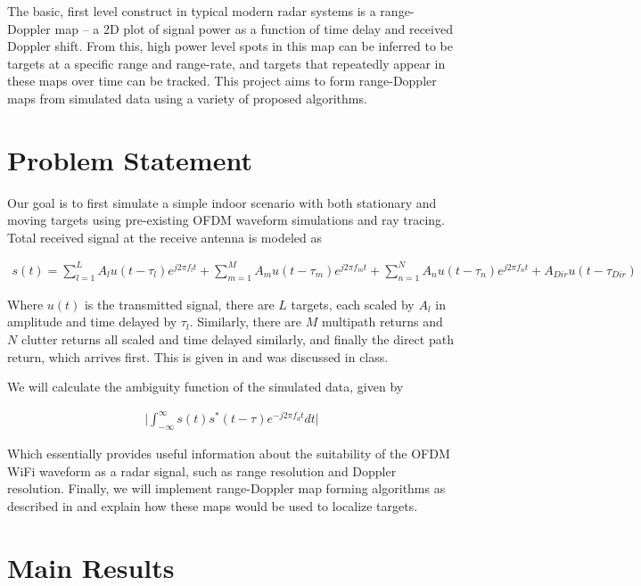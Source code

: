 \documentclass[article,11pt,onecolumn,final]{IEEEtran}
\begin{document}
The basic, first level construct in typical modern radar systems is a range-Doppler map -- a 2D plot of
signal power as a function of time delay and received Doppler shift. From this, high power level spots in
this map can be inferred to be targets at a specific range and range-rate, and targets that repeatedly
appear in these maps over time can be tracked. This project aims to form range-Doppler maps from
simulated data using a variety of proposed algorithms.

\section{Problem Statement} 
Our goal is to first simulate a simple indoor scenario with both stationary and moving targets using 
pre-existing OFDM waveform simulations and ray tracing. Total received signal at the receive antenna is modeled as

\begin{align*}
 s(t) = \sum_{l=1}^L A_l u(t-\tau_l)e^{j 2 \pi f_l t} + \sum_{m=1}^M A_m u(t-\tau_m)e^{j 2\pi f_m t} +
        \sum_{n=1}^N A_n u(t-\tau_n)e^{j 2 \pi f_n t} + A_{Dir} u(t-\tau_{Dir})
\end{align*}

Where $u(t)$ is the transmitted signal, there are $L$ targets, each scaled by $A_l$ in amplitude and time
delayed by $\tau_l$. Similarly, there are $M$ multipath returns and $N$ clutter returns all scaled and time delayed similarly, and finally the direct path return, which arrives first. This is given in \cite{Chetty} and was discussed in class.

We will calculate the ambiguity function of the simulated data, given by

\begin{align*}
\big|\int_{-\infty}^{\infty} s(t)s^*(t-\tau)e^{-j2\pi f_d t}dt \big|
\end{align*}

Which essentially provides useful information about the suitability of the OFDM WiFi waveform as a
radar signal, such as range resolution and Doppler resolution. Finally, we will implement range-Doppler
map forming algorithms as described in \cite{Colone2012} and explain how these maps would be used to localize
targets.


\section{Main Results}
\end{document}
